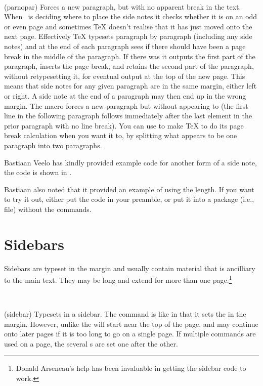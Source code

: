 \begin{syntax}
\cmd{\parnopar} \\
\end{syntax}
\glossary(parnopar)%
  {}%
  {Forces a new paragraph, but with no apparent break in the text.}
    When \ltx\  is deciding where to place the side notes it checks whether
it is on an odd or even page and sometimes TeX doesn't realise that it has just
moved onto the next page. Effectively TeX typesets paragraph by paragraph 
(including any side notes) and at the end of each paragraph sees if there
should have been a page break in the middle of the paragraph. If there was
it outputs the first part of the paragraph, inserts the page break, and retains
the second part of the paragraph, without retypesetting it, for eventual
output at the top of the new page. This means that side notes for any given
paragraph are in the same margin, either left or right. A side note at the
end of a paragraph may then end up in the wrong margin. The macro 
\cmd{\parnopar} forces a new paragraph 
but without appearing to (the first
line in the following paragraph follows immediately after the last element
in the prior paragraph with no line break). You can use \cmd{\parnopar}
to make TeX to do its page break calculation when you want it to, by splitting
what appears to be one paragraph into two paragraphs.

    Bastiaan Veelo has kindly provided example code 
for another form of a side note, the code is shown in
. 

    Bastiaan also noted that it provided an example of using the
\lnc{\foremargin} length.
    If you want to try it out, either put the code in your preamble,
or put it into a package (i.e.,  file) without the 
 commands. 


\section{Sidebars}

    Sidebars are typeset in the margin and usually 
contain material that is ancilliary to the main text. They may be long 
and extend for more than one page.\footnote{Donald 
Arseneau's help has been invaluable in getting
the sidebar code to work.}


\begin{syntax}
\cmd{\sidebar} \\
\end{syntax}
\glossary(sidebar)%
  {}%
  {Typesets  in a sidebar.}
The \cmd{\sidebar} command is like \cmd{\marginpar} in that it sets
the  in the margin. However, unlike \cmd{\marginpar} the
 will start near the top of the page, and may continue onto
later pages if it is too long to go on a single page. If multiple
\cmd{\sidebar} commands are used on a page, the several s
are set one after the other.

